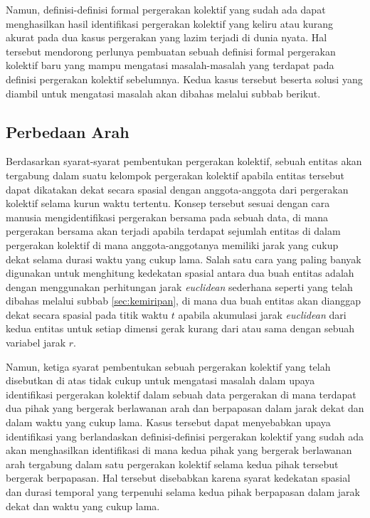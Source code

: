 Namun, definisi-definisi formal pergerakan kolektif yang sudah ada dapat menghasilkan hasil identifikasi pergerakan kolektif yang keliru atau kurang akurat pada dua kasus pergerakan yang lazim terjadi di dunia nyata. Hal tersebut mendorong perlunya pembuatan sebuah definisi formal pergerakan kolektif baru yang mampu mengatasi masalah-masalah yang terdapat pada definisi pergerakan kolektif sebelumnya. Kedua kasus tersebut beserta solusi yang diambil untuk mengatasi masalah akan dibahas melalui subbab berikut.

\subsection{Perbedaan Arah}
\label{subsec:beda-arah}
    
Berdasarkan syarat-syarat pembentukan pergerakan kolektif, sebuah entitas akan tergabung dalam suatu kelompok pergerakan kolektif apabila entitas tersebut dapat dikatakan dekat secara spasial dengan anggota-anggota dari pergerakan kolektif selama kurun waktu tertentu. Konsep tersebut sesuai dengan cara manusia mengidentifikasi pergerakan bersama pada sebuah data, di mana pergerakan bersama akan terjadi apabila terdapat sejumlah entitas di dalam pergerakan kolektif di mana anggota-anggotanya memiliki jarak yang cukup dekat selama durasi waktu yang cukup lama. Salah satu cara yang paling banyak digunakan untuk menghitung kedekatan spasial antara dua buah entitas adalah dengan menggunakan perhitungan jarak \textit{euclidean} sederhana seperti yang telah dibahas melalui subbab \ref{sec:kemiripan}, di mana dua buah entitas akan dianggap dekat secara spasial pada titik waktu $t$ apabila akumulasi jarak \textit{euclidean} dari kedua entitas untuk setiap dimensi gerak kurang dari atau sama dengan sebuah variabel jarak $r$.

Namun, ketiga syarat pembentukan sebuah pergerakan kolektif yang telah disebutkan di atas tidak cukup untuk mengatasi masalah dalam upaya identifikasi pergerakan kolektif dalam sebuah data pergerakan di mana terdapat dua pihak yang bergerak berlawanan arah dan berpapasan dalam jarak dekat dan dalam waktu yang cukup lama. Kasus tersebut dapat menyebabkan upaya identifikasi yang berlandaskan definisi-definisi pergerakan kolektif yang sudah ada akan menghasilkan identifikasi di mana kedua pihak yang bergerak berlawanan arah tergabung dalam satu pergerakan kolektif selama kedua pihak tersebut bergerak berpapasan. Hal tersebut disebabkan karena syarat kedekatan spasial dan durasi temporal yang terpenuhi selama kedua pihak berpapasan dalam jarak dekat dan waktu yang cukup lama.
    
